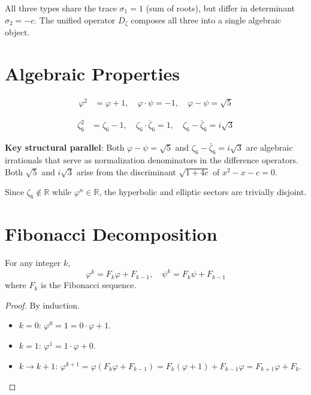 All three types share the trace $\sigma_1 = 1$ (sum of roots), but differ in determinant $\sigma_2 = -c$. The unified operator $D_\zeta$ composes all three into a single algebraic object.

\section{Algebraic Properties}
\label{sec:algebraic_properties}

\begin{theorem}
\label{thm:golden_properties}
\leanok
\begin{align}
\varphi^2 &= \varphi + 1, \quad \varphi \cdot \psi = -1, \quad \varphi - \psi = \sqrt{5}
\end{align}
\end{theorem}

\begin{theorem}
\label{thm:zeta6_properties}
\leanok
\begin{align}
\zeta_6^2 &= \zeta_6 - 1, \quad \zeta_6 \cdot \bar{\zeta}_6 = 1, \quad \zeta_6 - \bar{\zeta}_6 = i\sqrt{3}
\end{align}
\end{theorem}

\textbf{Key structural parallel}: Both $\varphi - \psi = \sqrt{5}$ and $\zeta_6 - \bar{\zeta}_6 = i\sqrt{3}$ are algebraic irrationals that serve as normalization denominators in the difference operators. Both $\sqrt{5}$ and $i\sqrt{3}$ arise from the discriminant $\sqrt{1 + 4c}$ of $x^2 - x - c = 0$.

Since $\zeta_6 \notin \mathbb{R}$ while $\varphi^n \in \mathbb{R}$, the hyperbolic and elliptic sectors are trivially disjoint.

\section{Fibonacci Decomposition}
\label{sec:fib_decomposition}

\begin{theorem}
\label{thm:fib_decomposition}
\leanok
For any integer $k$,
\[
\varphi^k = F_k\varphi + F_{k-1}, \quad \psi^k = F_k\psi + F_{k-1}
\]
where $F_k$ is the Fibonacci sequence.
\end{theorem}

\begin{proof}
By induction.
\begin{itemize}
\item $k=0$: $\varphi^0 = 1 = 0 \cdot \varphi + 1$.
\item $k=1$: $\varphi^1 = 1 \cdot \varphi + 0$.
\item $k \to k+1$: $\varphi^{k+1} = \varphi(F_k\varphi + F_{k-1}) = F_k(\varphi+1) + F_{k-1}\varphi = F_{k+1}\varphi + F_k$.
\end{itemize}
\end{proof}

